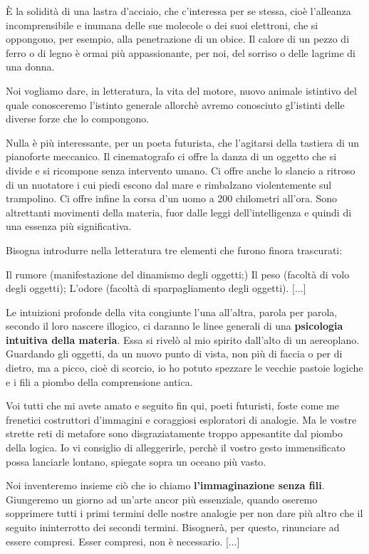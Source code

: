 \documentclass[a4paper, twoside, titlepage]{book}
\newcounter{mar}
\begin{document}
{È la solidità di una lastra d’acciaio, che c’interessa per se stessa, cioè l’alleanza incomprensibile e inumana delle sue molecole o dei suoi elettroni, che si oppongono, per esempio, alla penetrazione di un obice. Il calore di un pezzo di ferro o di legno è ormai più appassionante, per noi, del sorriso o delle lagrime di una donna.

Noi vogliamo dare, in letteratura, la vita del motore, nuovo animale istintivo del quale conosceremo l’istinto generale allorchè avremo conosciuto gl’istinti delle diverse forze che lo compongono.

Nulla è più interessante, per un poeta futurista, che l’agitarsi della tastiera di un pianoforte meccanico. Il cinematografo ci offre la danza di un oggetto che si divide e si ricompone senza intervento umano. Ci offre anche lo slancio a ritroso di un nuotatore i cui piedi escono dal mare e rimbalzano violentemente sul trampolino. Ci offre infine la corsa d’un uomo a 200 chilometri all’ora. Sono altrettanti movimenti della materia, fuor dalle leggi dell’intelligenza e quindi di una essenza più significativa.

Bisogna introdurre nella letteratura tre elementi che furono finora trascurati:

Il rumore (manifestazione del dinamismo degli oggetti;)
Il peso (facoltà di volo degli oggetti);
L’odore (facoltà di sparpagliamento degli oggetti). [...]

Le intuizioni profonde della vita congiunte l’una all’altra, parola per parola, secondo il loro nascere illogico, ci daranno le linee generali di una \textbf{psicologia intuitiva della materia}. Essa si rivelò al mio spirito dall’alto di un aereoplano. Guardando gli oggetti, da un nuovo punto di vista, non più di faccia o per di dietro, ma a picco, cioè di scorcio, io ho potuto spezzare le vecchie pastoie logiche e i fili a piombo della comprensione antica.

Voi tutti che mi avete amato e seguito fin qui, poeti futuristi, foste come me frenetici costruttori d’immagini e coraggiosi esploratori di analogie. Ma le vostre strette reti di metafore sono disgraziatamente troppo appesantite dal piombo della logica. Io vi consiglio di alleggerirle, perchè il vostro gesto immensificato possa lanciarle lontano, spiegate sopra un oceano più vasto.

Noi inventeremo insieme ciò che io chiamo \textbf{l’immaginazione senza fili}. Giungeremo un giorno ad un’arte ancor più essenziale, quando oseremo sopprimere tutti i primi termini delle nostre analogie per non dare più altro che il seguito ininterrotto dei secondi termini. Bisognerà, per questo, rinunciare ad essere compresi. Esser compresi, non è necessario. [...]

}
\end{document}
